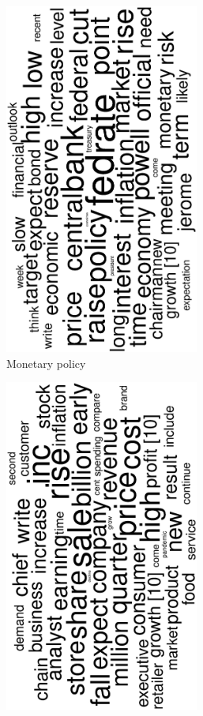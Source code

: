 \begin{figure}
\begin{subfigure}{0.32\textwidth}
		\includegraphics[width=0.7\textwidth,angle=270]{figures/wordcloud6.eps}
		\caption{Monetary policy}
	\end{subfigure}
	\begin{subfigure}{0.32\textwidth}
		\includegraphics[width=0.7\textwidth,angle=270]{figures/wordcloud9.eps}

\end{subfigure}
\end{figure}

